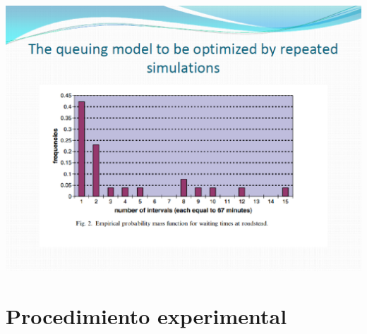 \documentclass[spanish,a4paper,11pt,twoside]{report}
\begin{document}

\begin{center}
\includegraphics[width=1\textwidth]{images/pic5.eps}\\[0.25cm]
\end{center}

\chapter{Procedimiento experimental}
\label{chapter:exp}
\end{document}
